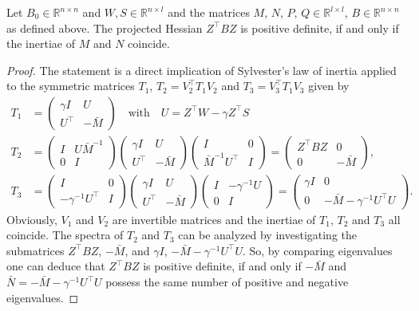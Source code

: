 \documentclass{svmult}
\begin{document}
\clearpage
\begin{lemma}
\label{tb:LEHMANN}
	Let $B_0 \in \mathbb{R}^{n \times n}$ and $W, S \in \mathbb{R}^{n \times l}$ and the matrices $M$, $N$, $P$, $Q \in \mathbb{R}^{l \times l}$, $B \in \mathbb{R}^{n \times n}$ as defined above. The projected Hessian $Z^{\top}BZ$ is positive definite, if and only if the inertiae of $M$ and $N$ coincide.
\end{lemma}
\begin{proof}
The statement is a direct implication of Sylvester's law of inertia applied to the symmetric matrices $T_1$, $T_2=V_2^{\top}T_1V_2$ and $T_3=V_3^{\top}T_1V_3$ given by
\begin{align*}
	T_1 &= \begin{pmatrix}
		\gamma I & U \\
		U^\top & -\bar{M}
	\end{pmatrix} \quad \mbox{with} \quad U = Z^{\top} W - \gamma Z^{\top} S\\
	T_2 &= \begin{pmatrix}
		I	& U\bar{M}^{-1}\\
		0 &	I
	\end{pmatrix}
	\begin{pmatrix}
		\gamma I & U \\
		U^\top & -\bar{M}
	\end{pmatrix}
	\begin{pmatrix}
		I	& 0 \\
		\bar{M}^{-1}U^\top &	I
	\end{pmatrix} = 
	\begin{pmatrix}
		Z^{\top}BZ & 0 \\
		0 &	-\bar{M}
	\end{pmatrix},\\
%
	T_3 &= \begin{pmatrix}
		I	& 0\\
		-\gamma^{-1}U^\top &	I
	\end{pmatrix}
	\begin{pmatrix}
		\gamma I & U \\
		U^\top & -\bar{M}
	\end{pmatrix}
	\begin{pmatrix}
		I	& -\gamma^{-1}U \\
		0 &	I
	\end{pmatrix} = 
	\begin{pmatrix}
		\gamma I & 0 \\
		0 &	-\bar{M} - \gamma^{-1}U^\top U
	\end{pmatrix} .
\end{align*}
Obviously, $V_1$ and $V_2$ are invertible matrices and the inertiae of $T_1$, $T_2$ and $T_3$ all coincide. The spectra of $T_2$ and $T_3$ can be analyzed by investigating the submatrices $Z^{\top}BZ$, $-\bar{M}$, and $\gamma I$, $-\bar{M} -\gamma^{-1} U^{\top}U$.
So, by comparing eigenvalues one can deduce that $Z^{\top}BZ$ is positive definite, if and only if $-\bar{M}$ and $\bar{N}=-\bar{M}-\gamma^{-1}U^{\top}U$ possess the same number of positive and negative eigenvalues.
\end{proof}
\end{document}
